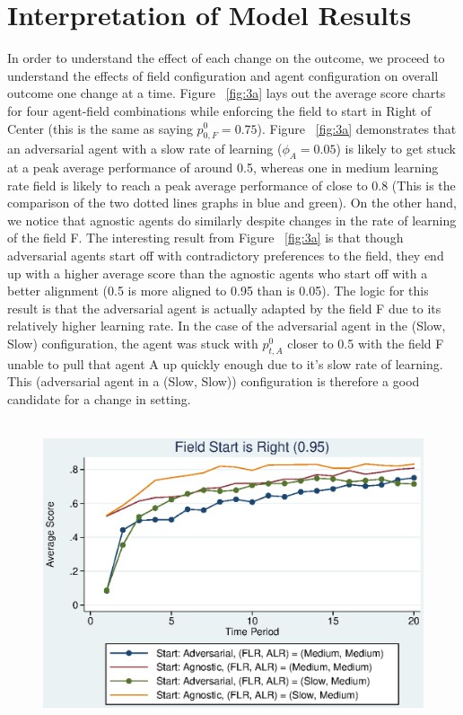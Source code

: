 \documentclass[12pt,letterpaper]{article}
\begin{document}
\section{Interpretation of Model Results}
\noindent In order to understand the effect of each change on the outcome, we proceed to understand the effects of field configuration and agent configuration on overall outcome one change at a time. Figure ~\ref{fig:3a} lays out the average score charts for four agent-field combinations while enforcing the field to start in Right of Center (this is the same as saying $p_{0,F}^0 = 0.75$). Figure ~\ref{fig:3a} demonstrates that an adversarial agent with a slow rate of learning ($\phi_A = 0.05$) is likely to get stuck at a peak average performance of around 0.5, whereas one in medium learning rate field is likely to reach a peak average performance of close to 0.8 (This is the comparison of the two dotted lines graphs in blue and green). On the other hand, we notice that agnostic agents do similarly despite changes in the rate of learning of the field F. The interesting result from Figure ~\ref{fig:3a} is that though adversarial agents start off with contradictory preferences to the field, they end up with a higher average score than the agnostic agents who start off with a better alignment (0.5 is more aligned to 0.95 than is 0.05). The logic for this result is that the adversarial agent is actually adapted by the field F due to its relatively higher learning rate. In the case of the adversarial agent in the (Slow, Slow) configuration, the agent was stuck with $p_{t,A}^0$ closer to 0.5 with the field F unable to pull that agent A up quickly enough due to it's slow rate of learning. This (adversarial agent in a (Slow, Slow)) configuration is therefore a good candidate for a change in setting.\\\\



\begin{figure}[h]
\begin{centering}
  \includegraphics[width=\textwidth]{frcmedium3c}
  \caption{}
  \label{fig:3c}
\end{centering}
\end{figure}
\end{document}
